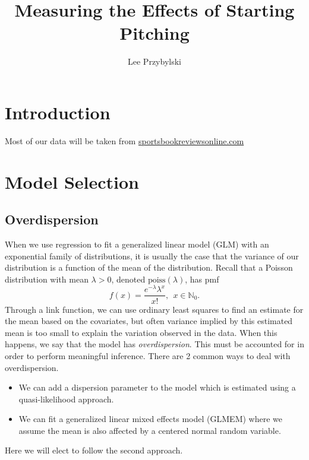 \documentclass [52pt] {article}
\title{Measuring the Effects of Starting Pitching}
\author{Lee Przybylski}
\newcommand{\N}{\mathbb{N}}
\begin{document}
\maketitle
{}


\section{Introduction}

Most of our data will be taken from \href{https://www.sportsbookreviewsonline.com/scoresoddsarchives/mlb/mlboddsarchives.htm}{sportsbookreviewsonline.com}

\section{Model Selection}

\subsection{Overdispersion}

When we use regression to fit a generalized linear model (GLM) with an exponential family of distributions, it is usually the case that the variance of our distribution is a function of the mean of the distribution.  Recall that a Poisson distribution with mean $\lambda>0$, denoted $\text{poiss}(\lambda)$, has pmf
\[f(x) = \frac{e^{-\lambda}\lambda^x}{x!},\:\:x\in\N_0.\]
Through a link function, we can use ordinary least squares to find an estimate for the mean based on the covariates, but often variance implied by this estimated mean is too small to explain the variation observed in the data.  When this happens, we say that the model has \emph{overdispersion}.  This must be accounted for in order to perform meaningful inference.  There are 2 common ways to deal with overdispersion.
\begin{itemize}
\item We can add a dispersion parameter to the model which is estimated using a quasi-likelihood approach.
\item We can fit a generalized linear mixed effects model (GLMEM) where we assume the mean is also affected by a centered normal random variable. 
\end{itemize}
Here we will elect to follow the second approach.
\end{document}
